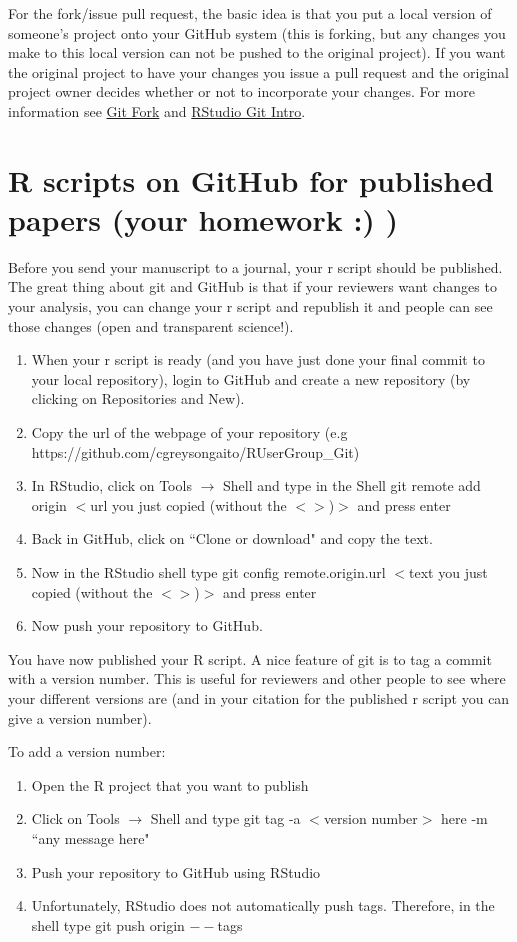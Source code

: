 \documentclass[12pt,letterpaper]{article} %
\begin{document}
For the fork/issue pull request, the basic idea is that you put a local version of someone's project onto your GitHub system (this is forking, but any changes you make to this local version can not be pushed to the original project). If you want the original project to have your changes you issue a pull request and the original project owner decides whether or not to incorporate your changes. For more information see \href{https://help.github.com/articles/fork-a-repo/}{Git Fork} and \href{http://r-bio.github.io/intro-git-rstudio/}{RStudio Git Intro}.

\section*{R scripts on GitHub for published papers (your homework :) )}
Before you send your manuscript to a journal, your r script should be published. The great thing about git and GitHub is that if your reviewers want changes to your analysis, you can change your r script and republish it and people can see those changes (open and transparent science!).
\begin{enumerate}
\item When your r script is ready (and you have just done your final commit to your local repository), login to GitHub and create a new repository (by clicking on Repositories and New).
\item Copy the url of the webpage of your repository (e.g https://github.com/cgreysongaito/RUserGroup\_Git)
\item In RStudio, click on Tools $\rightarrow$ Shell and type in the Shell git remote add origin $<$url you just copied (without the $<$$>$)$>$ and press enter
\item Back in GitHub, click on ``Clone or download" and copy the text.
\item Now in the RStudio shell type git config remote.origin.url $<$text you just copied (without the $<$$>$)$>$ and press enter
\item Now push your repository to GitHub.
\end{enumerate}

You have now published your R script. A nice feature of git is to tag a commit with a version number. This is useful for reviewers and other people to see where your different versions are (and in your citation for the published r script you can give a version number).

To add a version number:
\begin{enumerate}
\item Open the R project that you want to publish
\item Click on Tools $\rightarrow$ Shell and type git tag -a $<$version number$>$ here -m ``any message here"
\item Push your repository to GitHub using RStudio
\item Unfortunately, RStudio does not automatically push tags. Therefore, in the shell type git push origin $--$tags
\end{enumerate}
\end{document}
